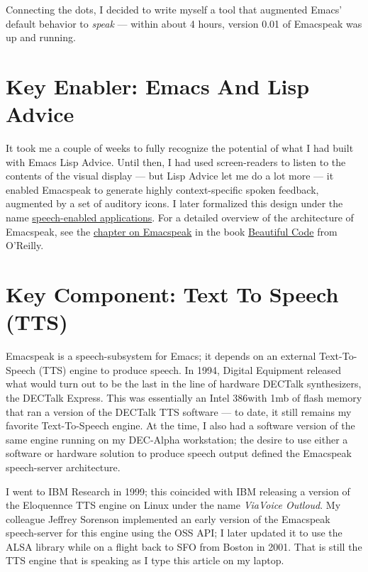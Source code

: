 \documentclass[11pt]{article}
\begin{document}
Connecting the dots, I decided to write myself a tool that
augmented Emacs' default behavior to \emph{speak}   —   within about 4
hours, version 0.01 of Emacspeak was up and running.


\section{Key Enabler: Emacs And Lisp Advice}
\label{sec-3}

It took me a couple of weeks to fully recognize the potential of
what I had built with Emacs Lisp Advice. Until then, I had used
screen-readers to listen to the contents of the visual display
  —   but Lisp Advice let me do a lot more   —   it enabled Emacspeak
to generate highly context-specific spoken feedback, augmented by
a set of auditory icons. I later formalized this design under the
name \href{http://en.wikipedia.org/wiki/Self-voicing}{speech-enabled applications}. For a detailed overview of the
architecture of Emacspeak, see the \href{http://emacspeak.sourceforge.net/raman/publications/bc-emacspeak/publish-emacspeak-bc.html}{chapter on Emacspeak} in the
book \href{http://emacspeak.blogspot.com/2007/07/emacspeak-and-beautiful-code.html}{Beautiful Code} from O'Reilly.

\section{Key Component: Text To Speech (TTS)}
\label{sec-4}

Emacspeak is a speech-subsystem for Emacs; it depends on an
external Text-To-Speech (TTS) engine to produce speech. In 1994,
Digital Equipment released what would turn out to be the last in
the line of hardware DECTalk synthesizers, the DECTalk
Express. This was essentially an Intel 386with 1mb of flash
memory that ran a version of the DECTalk TTS software   —   to
date, it still remains my favorite Text-To-Speech engine.
At the time,  I also had a software version of the same engine
running on my DEC-Alpha workstation;  the desire to use either a
software or hardware solution to produce speech output defined
the Emacspeak speech-server architecture.

I went to IBM Research in 1999; this coincided with IBM releasing
a version of the Eloquennce TTS engine on Linux under the name
\emph{ViaVoice Outloud}. My colleague Jeffrey Sorenson implemented an
early version of the Emacspeak speech-server for this engine using
the OSS API; I later updated it to use the ALSA library while on
a flight back to SFO from Boston in 2001. That is still the TTS
engine that is speaking as I type this article on my laptop. 
\end{document}
